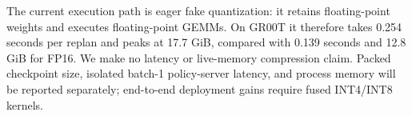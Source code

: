 The current execution path is eager fake quantization: it retains floating-point weights and executes floating-point GEMMs. On GR00T it therefore takes 0.254 seconds per replan and peaks at 17.7 GiB, compared with 0.139 seconds and 12.8 GiB for FP16. We make no latency or live-memory compression claim. Packed checkpoint size, isolated batch-1 policy-server latency, and process memory will be reported separately; end-to-end deployment gains require fused INT4/INT8 kernels.

